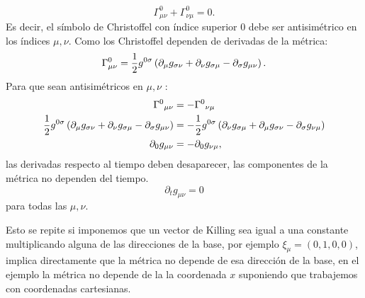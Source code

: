 \begin{equation}
    \Gamma_{\mu \nu}^0+\Gamma_{\nu \mu}^0=0   .
\end{equation}
Es decir, el símbolo de Christoffel con índice superior 0 debe ser antisimétrico en los índices $\mu, \nu$.
Como los Christoffel dependen de derivadas de la métrica:
\begin{equation}
    \Gamma_{\mu \nu}^0=\frac{1}{2} g^{0 \sigma}\left(\partial_{\mu} g_{ \sigma \nu}+\partial_{\nu} g_{ \sigma \mu}-\partial_{\sigma} g_{\mu \nu}\right).
\end{equation}
Para que sean antisimétricos en $\mu, \nu$ :
\begin{equation}
    \begin{aligned}
        \Gamma^0{}_{\mu \nu}                                                                                              & =-\Gamma^0{}_{\nu \mu}                                                                                                \\
        \frac{1}{2} g^{0 \sigma}\left(\partial_{\mu} g_{ \sigma \nu}+\partial_{\nu} g_{ \sigma \mu}-\partial_{\sigma} g_{\mu \nu}\right) & = - \frac{1}{2} g^{0 \sigma}\left(\partial_{\nu} g_{ \sigma \mu}+\partial_{\mu} g_{ \sigma \nu}-\partial_{\sigma} g_{\nu \mu}\right) \\
        \partial_{0} g_{\mu \nu}                                                                                               & = -\partial_{0} g_{\nu \mu },                                                                                              \\
    \end{aligned}
\end{equation}
las derivadas respecto al tiempo deben desaparecer, las componentes de la métrica no dependen del tiempo.
\begin{equation}
    \partial_t g_{\mu \nu}=0
\end{equation}
para todas las $\mu, \nu$.
\begin{note}
    Esto se repite si imponemos que un vector de Killing sea igual a una constante multiplicando alguna de las direcciones de la base, por ejemplo $\xi_\mu=(0,1,0,0)$, implica directamente que la métrica no depende de esa dirección de la base, en el ejemplo la métrica no depende de la la coordenada $x$ suponiendo que trabajemos con coordenadas cartesianas.
\end{note}